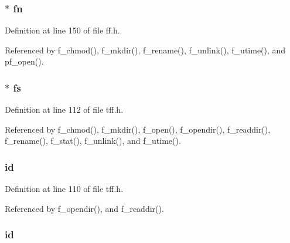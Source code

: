 \hypertarget{struct_d_i_r_af5245f40680a50c52ce1028bbe62d9f9}{
\subsubsection[{fn}]{$\ast$ fn}}\label{struct_d_i_r_af5245f40680a50c52ce1028bbe62d9f9}


Definition at line 150 of file ff.\-h.



Referenced by f\-\_\-chmod(), f\-\_\-mkdir(), f\-\_\-rename(), f\-\_\-unlink(), f\-\_\-utime(), and pf\-\_\-open().

\hypertarget{struct_d_i_r_a472e3612956e3ffb3ab823c37ca33250}{
\subsubsection[{fs}]{ $\ast$ fs}}\label{struct_d_i_r_a472e3612956e3ffb3ab823c37ca33250}


Definition at line 112 of file tff.\-h.



Referenced by f\-\_\-chmod(), f\-\_\-mkdir(), f\-\_\-open(), f\-\_\-opendir(), f\-\_\-readdir(), f\-\_\-rename(), f\-\_\-stat(), f\-\_\-unlink(), and f\-\_\-utime().

\hypertarget{struct_d_i_r_a588688f55d57bf8a7e8c1d2cf88a3c56}{
\subsubsection[{id}]{ id}}\label{struct_d_i_r_a588688f55d57bf8a7e8c1d2cf88a3c56}


Definition at line 110 of file tff.\-h.



Referenced by f\-\_\-opendir(), and f\-\_\-readdir().

\hypertarget{struct_d_i_r_a7b7a6396b2c82ad46c6d8b2bf141a8dd}{
\subsubsection[{id}]{ id}}\label{struct_d_i_r_a7b7a6396b2c82ad46c6d8b2bf141a8dd}



